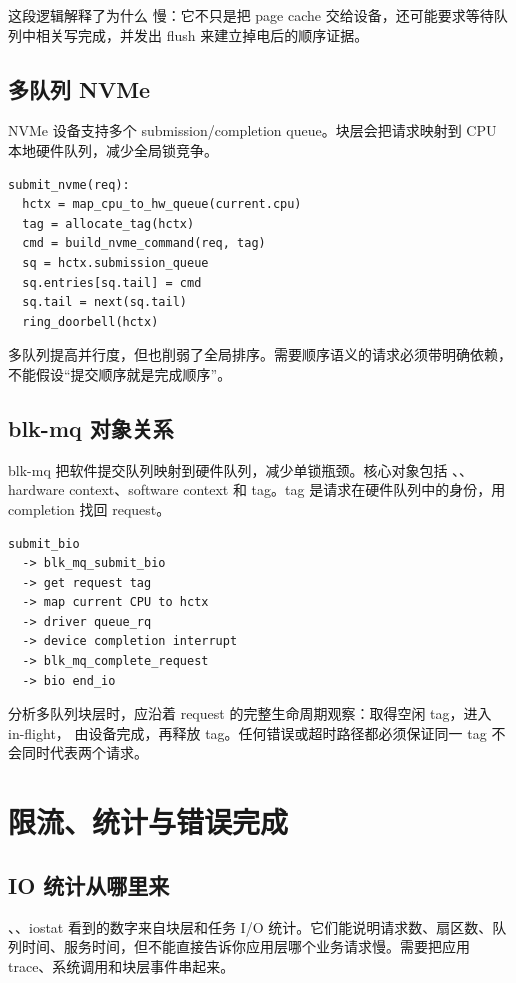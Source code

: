 这段逻辑解释了为什么  慢：它不只是把 page cache 交给设备，还可能要求等待队列中相关写完成，并发出 flush 来建立掉电后的顺序证据。

\subsection{多队列 NVMe}

NVMe 设备支持多个 submission/completion queue。块层会把请求映射到 CPU 本地硬件队列，减少全局锁竞争。

\begin{lstlisting}
submit_nvme(req):
  hctx = map_cpu_to_hw_queue(current.cpu)
  tag = allocate_tag(hctx)
  cmd = build_nvme_command(req, tag)
  sq = hctx.submission_queue
  sq.entries[sq.tail] = cmd
  sq.tail = next(sq.tail)
  ring_doorbell(hctx)
\end{lstlisting}

多队列提高并行度，但也削弱了全局排序。需要顺序语义的请求必须带明确依赖，不能假设“提交顺序就是完成顺序”。

\subsection{blk-mq 对象关系}

blk-mq 把软件提交队列映射到硬件队列，减少单锁瓶颈。核心对象包括 、、hardware context、software context 和 tag。tag 是请求在硬件队列中的身份，用 completion 找回 request。

\begin{lstlisting}
submit_bio
  -> blk_mq_submit_bio
  -> get request tag
  -> map current CPU to hctx
  -> driver queue_rq
  -> device completion interrupt
  -> blk_mq_complete_request
  -> bio end_io
\end{lstlisting}

分析多队列块层时，应沿着 request 的完整生命周期观察：取得空闲 tag，进入 in-flight，
由设备完成，再释放 tag。任何错误或超时路径都必须保证同一 tag 不会同时代表两个请求。

\section{限流、统计与错误完成}

\subsection{IO 统计从哪里来}

、、iostat 看到的数字来自块层和任务 I/O 统计。它们能说明请求数、扇区数、队列时间、服务时间，但不能直接告诉你应用层哪个业务请求慢。需要把应用 trace、系统调用和块层事件串起来。

